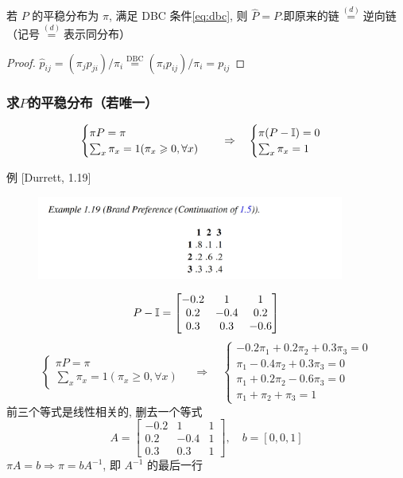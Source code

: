 \begin{corollary}[可逆性]
    若 $P$ 的平稳分布为 $\pi$, 满足 DBC 条件\eqref{eq:dbc}, 则 $\hat{P}=P$.即原来的链$\overset{(d)}{=}$逆向链（记号$\overset{(d)}{=}$表示同分布）
\end{corollary}
\begin{proof}
$\hat{p}_{ij}=(\pi_j p_{ji})/\pi_i\overset{\text{DBC}}{=}(\pi_i p_{ij})/\pi_i=p_{ij}$
\end{proof}

\subsubsection{求$P$的平稳分布（若唯一）}
\[
\begin{cases}
    \pi P=\pi\\
    \sum_{x}\pi_x=1(\pi_x\geqslant 0,\forall x)
\end{cases}\quad \Rightarrow \quad
\begin{cases}
    \pi(P-\mathbb I)=0\\
    \sum_x\pi_x=1
\end{cases}
\]
\begin{example}
例 [Durrett, 1.19]
    \begin{figure}[H]
        \centering
        \includegraphics[width=0.9\textwidth]{figures/1_19.png}
    \end{figure}
\end{example}
\[
P-\mathbb I=\begin{bmatrix}
    -0.2 & 1 & 1\\
    0.2 & -0.4 & 0.2\\
    0.3 & 0.3 & -0.6
\end{bmatrix}
\]
\[
\begin{cases}
    \pi P=\pi\\
    \sum_{x}\pi_x=1(\pi_x\geq 0,\forall x)
\end{cases}\quad \Rightarrow \quad
\begin{cases}
    -0.2\pi_1+0.2\pi_2+0.3\pi_3=0\\
    \pi_1-0.4\pi_2+0.3\pi_3=0\\
    \pi_1+0.2\pi_2-0.6\pi_3=0\\
    \pi_1+\pi_2+\pi_3=1
\end{cases}
\]
前三个等式是线性相关的, 删去一个等式
\[
A=\begin{bmatrix}
    -0.2 & 1 & 1\\
    0.2 & -0.4 & 1\\
    0.3 & 0.3 & 1
\end{bmatrix},\quad b=[0,0,1]
\]
$\pi A=b\Rightarrow \pi=bA^{-1}$, 即 $A^{-1}$ 的最后一行

\newpage